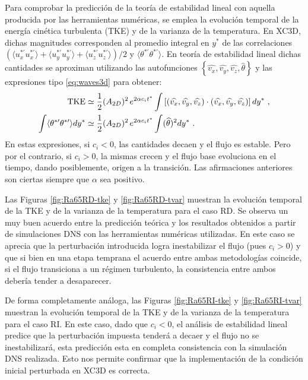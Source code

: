 Para comprobar la predicción de la teoría de estabilidad lineal con aquella producida por las herramientas numéricas, se emplea la evolución temporal de la energía cinética turbulenta (TKE) y de la varianza de la temperatura. En XC3D, dichas magnitudes corresponden al promedio integral en $y^*$ de las correlaciones $( \langle u^{* \prime}_x u^{* \prime}_x \rangle + \langle u^{* \prime}_y u^{* \prime}_y  \rangle + \langle u^{* \prime}_z u^{* \prime}_z  \rangle) / 2$ y $\langle \theta^{* \prime} \theta^{* \prime} \rangle$. En teoría de estabilidad lineal dichas cantidades se aproximan utilizando las autofunciones $\left\lbrace \widehat{v_x}, \widehat{v_y}, \widehat{v_z}, \widehat{\theta} \right\rbrace$ y las expresiones tipo \ref{eq:waves3d} para obtener:
\begin{align}
\text{TKE} &\simeq \frac{1}{2} (A_{2D})^2 \hspace*{0.5mm} e^{2 \alpha c_i t^*} \int \left[  ( \widehat{v_x}, \widehat{v_y}, \widehat{v_z} ) \cdot ( \widehat{v_x}, \widehat{v_y}, \widehat{v_z} )  \right] dy^* \text{ ,} \\
\int \langle \theta^{* \prime} \theta^{* \prime} \rangle dy^* &\simeq \frac{1}{2} (A_{2D})^2 \hspace*{0.5mm} e^{2 \alpha c_i t^*} \int (\widehat{\theta})^2 dy^* \text{ .}
\end{align}   
En estas expresiones, si $c_i < 0$, las cantidades decaen y el flujo es estable. Pero por el contrario, si $c_i > 0$, la mismas crecen y el flujo base evoluciona en el tiempo, dando posiblemente, origen a la transición. Las afirmaciones anteriores son ciertas siempre que $\alpha$ sea positivo.

Las Figuras \ref{fig:Ra65RD-tke} y \ref{fig:Ra65RD-tvar} muestran la evolución temporal de la TKE y de la varianza de la temperatura para el caso RD. Se observa un muy buen acuerdo entre la predicción teórica y los resultados obtenidos a partir de simulaciones DNS con las herramientas numéricas utilizadas. En este caso se aprecia que la perturbación introducida logra inestabilizar el flujo (pues $c_i>0$) y que si bien en una etapa temprana el acuerdo entre ambas metodologías coincide, si el flujo transiciona a un régimen turbulento, la consistencia entre ambos debería tender a desaparecer.  

De forma completamente análoga, las Figuras \ref{fig:Ra65RI-tke} y \ref{fig:Ra65RI-tvar} muestran la evolución temporal de la TKE y de la varianza de la temperatura para el caso RI. En este caso, dado que $c_i<0$, el análisis de estabilidad lineal predice que la perturbación impuesta tenderá a decaer y el flujo no se inestabilizará, esta predicción esta en completa consistencia con la simulación DNS realizada. Esto nos permite confirmar que la implementación de la condición inicial perturbada en XC3D es correcta.  

